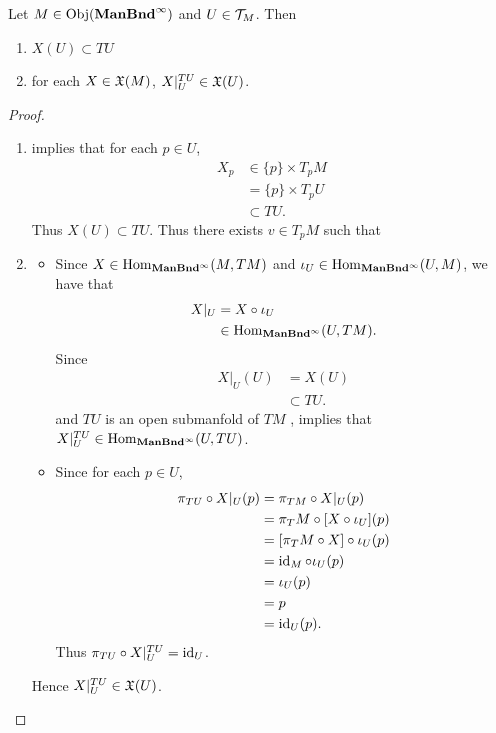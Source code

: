 \documentclass{book}
\begin{document}
\begin{ex}
	Let $M \in \operatorname{Obj}(\operatorname*{\text{\textbf{ManBnd}}^{\infty}})$ and $U \in \mathcal{T}_M$. Then 
	\begin{enumerate}
		\item $X(U) \subset TU$
		\item for each $X \in \mathfrak{X}(M)$, $X|_U^{TU} \in \mathfrak{X}(U)$. 
	\end{enumerate}
\end{ex}

\begin{proof}
	\begin{enumerate}
		\item {} implies that for each $p \in U$,
		\begin{align*}
			X_p
			& \in \{p\} \times T_pM \\
			& = \{p\} \times T_pU \\
			& \subset TU.
		\end{align*}
		Thus $X(U) \subset TU$.
		Thus there exists $v \in T_pM$ such that 
		\item 
		\begin{itemize}
			\item Since $X \in \operatorname{Hom}_{\operatorname*{\text{\textbf{ManBnd}}^{\infty}}}(M, TM)$ and $\iota_U \in \operatorname{Hom}_{\operatorname*{\text{\textbf{ManBnd}}^{\infty}}}(U, M)$, we have that 
			\begin{align*}
				X|_U 
				& = X \circ \iota_U \\
				& \in \operatorname{Hom}_{\operatorname*{\text{\textbf{ManBnd}}^{\infty}}}(U, TM).
			\end{align*}
			Since  
			\begin{align*}
				X|_U(U) 
				& = X(U) \\
				& \subset TU.
			\end{align*}
			and $TU$ is an open submanfold of $TM$ ,  implies that $X|_U^{TU} \in \operatorname{Hom}_{\operatorname*{\text{\textbf{ManBnd}}^{\infty}}}(U, TU)$. 
			\item Since for each $p \in U$,
			\begin{align*}
				\pi_{TU} \circ X|_U (p)
				& = \pi_{TM} \circ X|_U(p) \\
				& = \pi_TM \circ [X \circ \iota_U](p) \\
				& = [\pi_TM \circ X] \circ \iota_U(p) \\
				& = \operatorname{id}_M \circ \iota_U(p) \\
				& = \iota_U(p) \\
				& = p \\
				& = \operatorname{id}_U(p).
			\end{align*}
			Thus $\pi_{TU} \circ X|_U^{TU} = \operatorname{id}_U$.
		\end{itemize}
		Hence $X|_U^{TU} \in \mathfrak{X}(U)$.
	\end{enumerate}
\end{proof}
\end{document}
